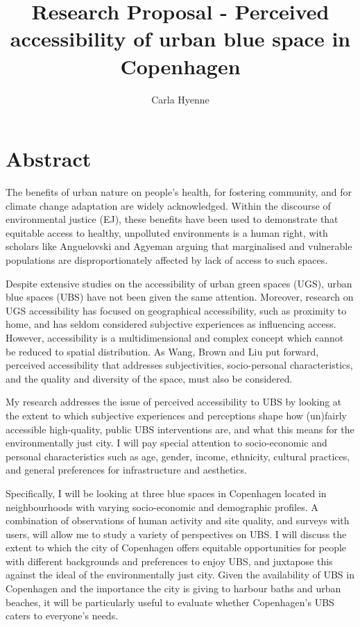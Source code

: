 \documentclass{article}
\title{Research Proposal - Perceived accessibility of urban blue space in Copenhagen}
\author{Carla Hyenne}
\date{}
\begin{document}
\maketitle

\tableofcontents 

\pagebreak
\section{Abstract}

The benefits of urban nature on people’s health, for fostering community, and for climate change adaptation are widely acknowledged. Within the discourse of environmental justice (EJ), these benefits have been used to demonstrate that equitable access to healthy, unpolluted environments is a human right, with scholars like Anguelovski and Agyeman arguing that marginalised and vulnerable populations are disproportionately affected by lack of access to such spaces. 

Despite extensive studies on the accessibility of urban green spaces (UGS), urban blue spaces (UBS) have not been given the same attention. Moreover, research on UGS accessibility has focused on geographical accessibility, such as proximity to home, and has seldom considered subjective experiences as influencing access. However, accessibility is a multidimensional and complex concept which cannot be reduced to spatial distribution. As Wang, Brown and Liu put forward, perceived accessibility that addresses subjectivities, socio-personal characteristics, and the quality and diversity of the space, must also be considered.

My research addresses the issue of perceived accessibility to UBS by looking at the extent to which subjective experiences and perceptions shape how (un)fairly accessible high-quality, public UBS interventions are, and what this means for the environmentally just city.
I will pay special attention to socio-economic and personal characteristics such as age, gender, income, ethnicity, cultural practices, and general preferences for infrastructure and aesthetics.

Specifically, I will be looking at three blue spaces in Copenhagen located in neighbourhoods with varying socio-economic and demographic profiles. A combination of observations of human activity and site quality, and surveys with users, will allow me to study a variety of perspectives on UBS. I will discuss the extent to which the city of Copenhagen offers equitable opportunities for people with different backgrounds and preferences to enjoy UBS, and juxtapose this against the ideal of the environmentally just city. 
Given the availability of UBS in Copenhagen and the importance the city is giving to harbour baths and urban beaches, it will be particularly useful to evaluate whether Copenhagen’s UBS caters to everyone’s needs.
\end{document}
